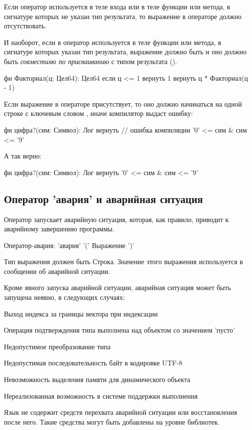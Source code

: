 Если оператор  используется в теле входа или в теле функции или метода, в сигнатуре которых не указан тип результата, 
то выражение в операторе должно отсутствовать. 

И наоборот, если в оператор используется в теле функции или метода, в сигнатуре которых указан тип результата, выражение должно быть и 
оно должно быть \emph{совместимо по присваиванию} с типом результата ().

\begin{Trivil}
фн Факториал(ц: Цел64): Цел64 {
    если ц <= 1 { вернуть 1 }
    вернуть ц * Факториал(ц - 1)
}
\end{Trivil}

Если выражение в операторе присутствует, то оно должно начинаться на одной строке с ключевым словом ,
иначе компилятор выдаст ошибку:
\begin{SampleErr}[vspace=2pt]
фн цифра?(сим: Символ): Лог {
    вернуть  // ошибка компиляции
        '0' <= сим & сим <= '9'
}
\end{SampleErr}

А так верно:
\begin{Trivil}[vspace=2pt]
фн цифра?(сим: Символ): Лог {
    вернуть '0' <= сим 
      & сим <= '9'
}
\end{Trivil}



\hypertarget{crash-stmt}{%
\subsection{Оператор 'авария' и аварийная ситуация}\label{stmt:crash-stmt}}

Оператор  запускает аварийную ситуация, которая, как правило, приводит к аварийному завершению программы. 

\begin{Grammar}
Оператор-авария: 'авария' '(' Выражение ')'
\end{Grammar}

Тип выражения должен быть Строка. Значение этого выражения используется в сообщении об аварийной ситуации.

Кроме явного запуска аварийной ситуации, аварийная ситуация может быть запущена неявно, в следующих случаях:
\begin{d_itemize}
\item
    Выход индекса за границы вектора при индексации
\item
    Операция подтверждения типа выполнена над объектом со значением 'пусто'
\item
    Недопустимое преобразование типа 
\item
    Недопустимая последовательность байт в кодировке UTF-8
\item
    Невозможность выделения памяти для динамического объекта
\item
    Нереализованная возможность в системе поддержки выполнения
\end{d_itemize}

\bigskip
Язык \thelang{} не содержит средств перехвата аварийной ситуации или восстановления после него. 
Такие средства могут быть добавлены на уровне библиотек.

